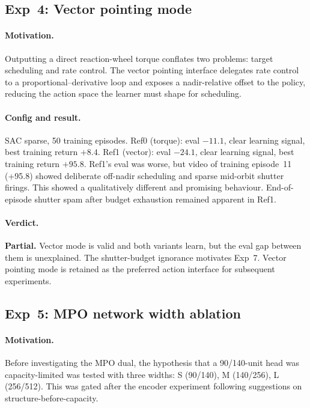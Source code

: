 \subsection{Exp~4: Vector pointing mode}
\label{sec:exp4}

\paragraph{Motivation.}
Outputting a direct reaction-wheel torque conflates two problems: target scheduling and rate control.
The vector pointing interface delegates rate control to a proportional--derivative loop
and exposes a nadir-relative offset to the policy, reducing the action space the learner must shape for scheduling.

\paragraph{Config and result.}
SAC sparse, 50 training episodes.
Ref0 (torque): eval $-11.1$, clear learning signal, best training return $+8.4$.
Ref1 (vector): eval $-24.1$, clear learning signal, best training return $+95.8$.
Ref1's eval was worse, but video of training episode~11 (+95.8) showed deliberate off-nadir scheduling
and sparse mid-orbit shutter firings.
This showed a qualitatively different and promising behaviour.
End-of-episode shutter spam after budget exhaustion remained apparent in Ref1.

\paragraph{Verdict.}
\textbf{Partial.}
Vector mode is valid and both variants learn, but the eval gap between them is unexplained.
The shutter-budget ignorance motivates Exp~7.
Vector pointing mode is retained as the preferred action interface for subsequent experiments.

\subsection{Exp~5: MPO network width ablation}
\label{sec:exp5}

\paragraph{Motivation.}
Before investigating the MPO dual, the hypothesis that a 90/140-unit head was capacity-limited
was tested with three widths: S (90/140), M (140/256), L (256/512).
This was gated after the encoder experiment following \citet{bruin2018irl} suggestions
on structure-before-capacity.

